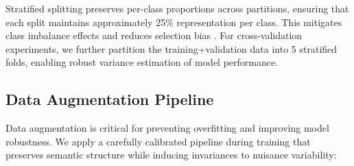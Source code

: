 \documentclass[11pt,a4paper]{article}
\begin{document}
Stratified splitting preserves per-class proportions across partitions, ensuring that each split maintains approximately 25\% representation per class. This mitigates class imbalance effects and reduces selection bias \cite{kohavi1995cv}. For cross-validation experiments, we further partition the training+validation data into 5 stratified folds, enabling robust variance estimation of model performance.

\subsection{Data Augmentation Pipeline}
\label{sec:augmentation_pipeline}

Data augmentation is critical for preventing overfitting and improving model robustness. We apply a carefully calibrated pipeline during training that preserves semantic structure while inducing invariances to nuisance variability:
\end{document}
